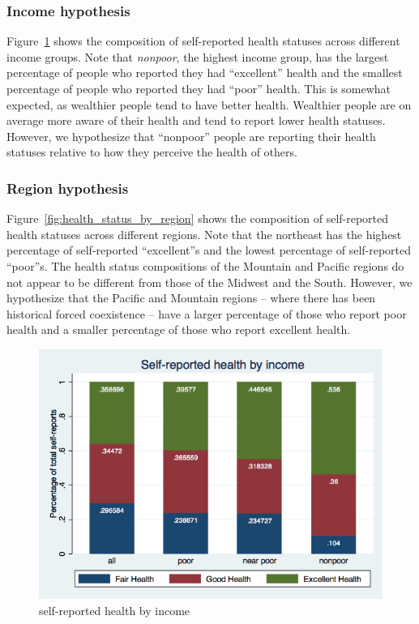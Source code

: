 \documentclass[12pt]{article}
\begin{document}
\subsubsection{Income hypothesis}
Figure~\ref{fig:health_status_by_income} shows the composition of self-reported health statuses across different income groups. Note that \emph{nonpoor}, the highest income group, has the largest percentage of people who reported they had ``excellent'' health and the smallest percentage of people who reported they had ``poor'' health. 
This is somewhat expected, as wealthier people tend to have better health. 
Wealthier people are on average more aware of their health and tend to report lower health statuses. 
However, we hypothesize that ``nonpoor'' people are reporting their health statuses relative to how they perceive the health of others. 

\subsubsection{Region hypothesis}
Figure~\ref{fig:health_status_by_region} shows the composition of self-reported health statuses across different regions. 
Note that the northeast has the highest percentage of self-reported ``excellent''s and the lowest percentage of self-reported ``poor''s. 
The health status compositions of the Mountain and Pacific regions do not appear to be different from those of the Midwest and the South. 
However, we hypothesize that the Pacific and Mountain regions -- where there has been historical forced coexistence -- have a larger percentage of those who report poor health and a smaller percentage of those who report excellent health.

\begin{figure}[ht!]
\centering
\includegraphics[scale=0.5]{health_status_by_income.png}
\caption{self-reported health by income}
\label{fig:health_status_by_income}
\end{figure}
\end{document}
